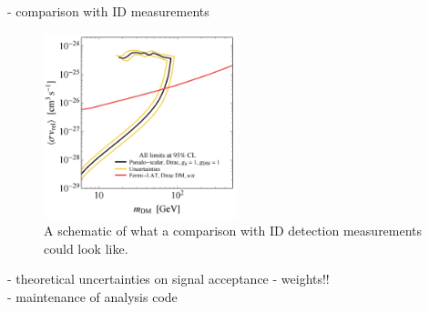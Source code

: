 - comparison with ID measurements\\

\begin{figure}[htb]
\centering
\includegraphics[width=0.5\textwidth]{Figures/id.png}
\caption{A schematic of what a comparison with ID detection measurements could look like.}
\label{fig:id}
\end{figure}

- theoretical uncertainties on signal acceptance - weights!! \\
- maintenance of analysis code\\